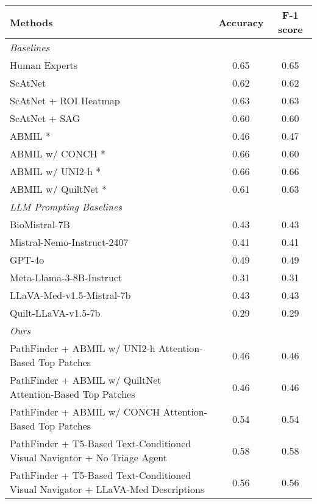 \begin{table*}[h]
  \centering
  \small
  \begin{tabular}{lcc}
    \toprule
    Methods & Accuracy & F-1 score \\ %
    \midrule
    \textit{Baselines} &  & \\
    \hdashline
    Human Experts \cite{elmore2017pathologists} & 0.65  & 0.65 \\
    \hdashline
    ScAtNet \cite{wu2021scale} & 0.62 & 0.62 \\ 
    ScAtNet + ROI Heatmap \cite{ghezloo2024} & 0.63 & 0.63 \\ 
    ScAtNet + SAG \cite{liu2024semantics} & 0.60 & 0.60 \\  
    ABMIL \cite{ilse2018attention}* & 0.46 & 0.47 \\ 
    ABMIL w/ CONCH \cite{conch}* & 0.66 & 0.60 \\
    ABMIL w/ UNI2-h \cite{uni}* & 0.66 & 0.66 \\
    ABMIL w/ QuiltNet \cite{ikezogwo2023quilt}* & 0.61 & 0.63 \\
    \midrule
    \textit{LLM Prompting Baselines} &  & \\
    \hdashline
    BioMistral-7B & 0.43 & 0.43 \\
    Mistral-Nemo-Instruct-2407 & 0.41 & 0.41 \\
    GPT-4o & 0.49 & 0.49 \\
    Meta-Llama-3-8B-Instruct & 0.31 & 0.31 \\
    LLaVA-Med-v1.5-Mistral-7b & 0.43 & 0.43 \\
    Quilt-LLaVA-v1.5-7b & 0.29 & 0.29 \\
    \midrule
    \textit{Ours} &  & \\
    \hdashline
    PathFinder + ABMIL w/ UNI2-h Attention-Based Top Patches & 0.46 & 0.46 \\
    PathFinder + ABMIL w/ QuiltNet Attention-Based Top Patches & 0.46 & 0.46 \\
    PathFinder + ABMIL w/ CONCH Attention-Based Top Patches & 0.54 & 0.54 \\
    PathFinder + T5-Based Text-Conditioned Visual Navigator + No Triage Agent & 0.58 & 0.58 \\
    PathFinder + T5-Based Text-Conditioned Visual Navigator + LLaVA-Med Descriptions & 0.56 & 0.56 \\

\end{tabular}
\end{table*}
